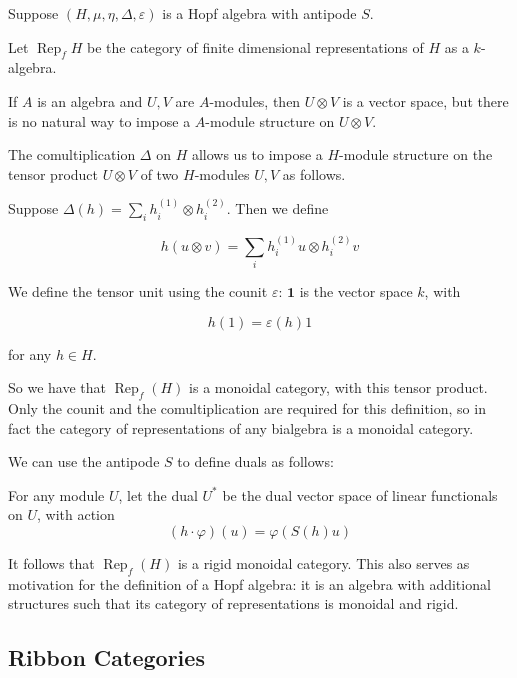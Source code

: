 \documentclass[]{article}
\newcommand{\Rep}{\operatorname{Rep}}
\numberwithin{equation}{subsection}
\begin{document}
Suppose $(H, \mu, \eta, \Delta, \varepsilon)$ is a Hopf algebra with antipode $S$. 

Let $\Rep_f H$ be the category of finite dimensional representations of $H$ as a $k$-algebra.

If $A$ is an algebra and $U, V$ are $A$-modules, then $U \otimes V$ is a vector
space, but there is no natural way to impose a $A$-module structure on $U
\otimes V$. 

The comultiplication $\Delta$ on $H$ allows us to impose a $H$-module structure
on the tensor product $U \otimes V$ of two $H$-modules $U,V$ as follows.

Suppose $\Delta(h) = \sum _{i} h^{(1)}_i \otimes h^{(2)}_i$. Then we define

\begin{equation}
    h (u \otimes v) = \sum_{i} h^{(1)}_i u \otimes h^{(2)}_i v
\end{equation}

We define the tensor unit using the counit $\varepsilon$: $\mathbf{1}$ is the vector space $k$, with 

\begin{equation}
    h(1) = \varepsilon(h) 1
\end{equation}

 for any $h\in H$.

So we have that $\Rep_f(H)$ is a monoidal category, with this tensor product.
Only the counit and the comultiplication are required for this definition, so
in fact the category of representations of any bialgebra is a monoidal
category.

We can use the antipode $S$ to define duals as follows:

For any module $U$, let the dual $U^*$ be the dual vector space of linear functionals on $U$, with action
\begin{equation}
    (h\cdot \varphi)(u)  = \varphi(S(h) u)
\end{equation}

It follows that $\Rep_f(H)$ is a rigid monoidal category. This also serves as
motivation for the definition of a Hopf algebra: it is an algebra with
additional structures such that its category of representations is monoidal and
rigid. 



\subsection{Ribbon Categories}
\end{document}
